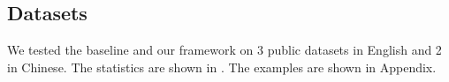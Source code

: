 \begin{table}[th]
\setlength\tabcolsep{3pt}
\centering
\scriptsize
\caption{Descriptions of the datasets. ``Ave Len'' means the average length of context. ``\% RW'' denotes 
the percentage of samples whose current utterance is actually rewritten.}
\label{tab:statitics-datasets}
\end{table}

\subsection{Datasets}
We tested the baseline and our framework on 3 public datasets in English and 2 in Chinese.
The statistics are shown in . The examples are shown in Appendix.

